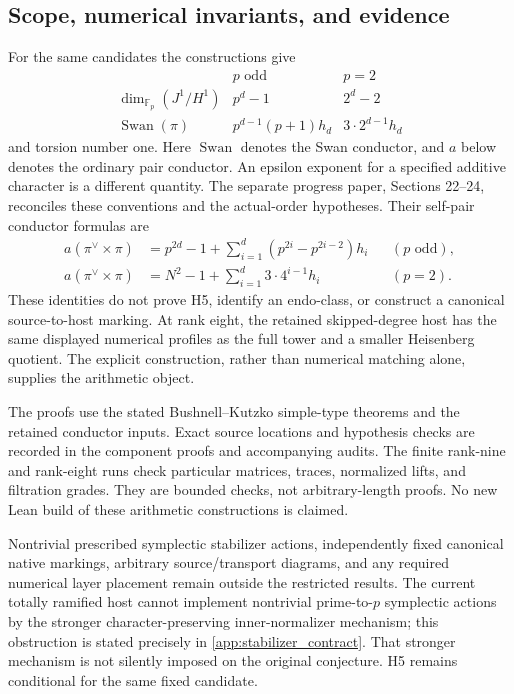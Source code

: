 \documentclass[11pt]{amsart}
\theoremstyle{definition}
\theoremstyle{remark}
\newcommand{\FF}{\mathbb F}
\newcommand{\Swan}{\operatorname{Swan}}
\begin{document}
\subsection{Scope, numerical invariants, and evidence}

For the same candidates the constructions give
\[
\begin{array}{c|c|c}
 & p\text{ odd} & p=2\\ \hline
\dim_{\FF_p}(J^1/H^1) & p^d-1 & 2^d-2\\
\Swan(\pi)&p^{d-1}(p+1)h_d&3\cdot2^{d-1}h_d
\end{array}
\]
and torsion number one. Here \(\Swan\) denotes the Swan conductor,
and \(a\) below denotes the ordinary pair conductor. An epsilon exponent
for a specified additive character is a different quantity. The separate
progress paper, Sections 22--24, reconciles these conventions and the
actual-order hypotheses. Their self-pair conductor formulas are
\[
\begin{aligned}
a(\pi^\vee\times\pi)
 &=p^{2d}-1+\sum_{i=1}^d(p^{2i}-p^{2i-2})h_i
 &&(p\text{ odd}),\\
a(\pi^\vee\times\pi)
 &=N^2-1+\sum_{i=1}^d3\cdot4^{i-1}h_i
 &&(p=2).
\end{aligned}
\]
These identities do not prove H5, identify an endo-class, or construct
a canonical source-to-host marking. At rank eight, the retained
skipped-degree host has the same displayed numerical profiles as the
full tower and a smaller Heisenberg quotient. The explicit construction,
rather than numerical matching alone, supplies the arithmetic object.

The proofs use the stated Bushnell--Kutzko simple-type theorems
\cite{BushnellKutzko1993} and the retained conductor inputs. Exact source
locations and hypothesis checks are recorded in the component proofs
and accompanying audits. The finite rank-nine and rank-eight runs check
particular matrices, traces, normalized lifts, and filtration grades.
They are bounded checks, not arbitrary-length proofs. No new Lean build
of these arithmetic constructions is claimed.

Nontrivial prescribed symplectic stabilizer actions, independently fixed
canonical native markings, arbitrary source/transport diagrams, and any
required numerical layer placement remain outside the restricted results.
The current totally ramified host cannot implement nontrivial
prime-to-\(p\) symplectic actions by the stronger character-preserving
inner-normalizer mechanism; this obstruction is stated precisely in
\cref{app:stabilizer_contract}. That stronger mechanism is not silently
imposed on the original conjecture. H5 remains conditional for the same
fixed candidate.
\end{document}
